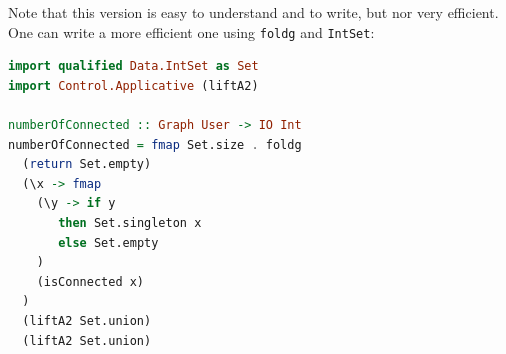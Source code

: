 \documentclass[10pt,a4paper]{article}
\begin{document}
Note that this version is easy to understand and to write, but nor very efficient. One can write a more efficient one using \verb|foldg| and \verb|IntSet|:
\begin{lstlisting}[language=Haskell, frame=single]
import qualified Data.IntSet as Set
import Control.Applicative (liftA2)

numberOfConnected :: Graph User -> IO Int
numberOfConnected = fmap Set.size . foldg
  (return Set.empty)
  (\x -> fmap
    (\y -> if y
       then Set.singleton x
       else Set.empty
    )
    (isConnected x)
  )
  (liftA2 Set.union)
  (liftA2 Set.union)
\end{lstlisting}
\end{document}
